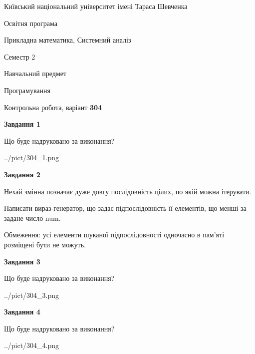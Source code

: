 \documentclass[12pt, ukrainian]{article}
\begin{document}
{{\begin {small}\par
{ \center  Київський національний університет імені Тараса Шевченка \par}
{\parbox {5 cm}{Освітня програма \hfill}{\parbox {8 cm}{Прикладна математика, Системний аналіз \hfill}}\parbox {5 cm}{\hfill Семестр 2}}\par
{\parbox {5 cm} {Навчальний предмет \hfill}\parbox {7 cm}{Програмування \hfill}\parbox {6cm}{\hfill}\par}\vspace{-7pt} \end{small}}{\center Контрольна робота, варіант  \No \textbf
{ 304 }\par}}
{
\begin {large}
{\begin {center}\textbf{Завдання 1}\end {center}}\par
Що буде надруковано за виконання?\par\par
\begin{center}
	{../pict/304_1.png}
\end{center}
\newpage

{\begin {center}\textbf{Завдання 2}\end {center}}\par
Нехай змінна  позначає дуже довгу послідовність цілих, по якій можна ітерувати.

Написати вираз-генератор, що задає підпослідовність її елементів, що менші за задане число num.

Обмеження: усі елементи шуканої підпослідовності одночасно в пам'яті розміщені бути не можуть.\par
\newpage

{\begin {center}\textbf{Завдання 3}\end {center}}\par
Що буде надруковано за виконання?
\begin{center}
	{../pict/304_3.png}
\end{center}
\newpage

{\begin {center}\textbf{Завдання 4}\end {center}}\par
Що буде надруковано за виконання?\par
\begin{center}
	{../pict/304_4.png}
\end{center}
\newpage


\end{large}}
\end{document}
